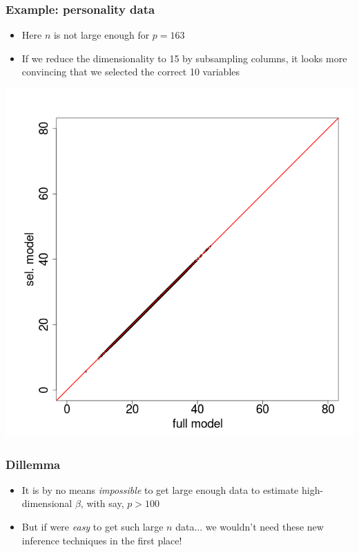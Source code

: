 \documentclass{beamer}
\begin{document}
\begin{frame}
\frametitle{Example: personality data}
\begin{itemize}
\item Here $n$ is not large enough for $p = 163$
\item If we reduce the dimensionality to 15 by subsampling columns, it looks more convincing that we selected the correct 10 variables
\end{itemize}
\begin{center}
\includegraphics[scale = 0.2]{pf16_modelcheck2.png}
\end{center}
\end{frame}


\begin{frame}
\frametitle{Dillemma}
\begin{itemize}
\item It is by no means \emph{impossible} to get large enough data to estimate high-dimensional $\beta$, with say, $p > 100$
\item But if were \emph{easy} to get such large $n$ data... we wouldn't need these new inference techniques in the first place!
\end{itemize}
\end{frame}
\end{document}
